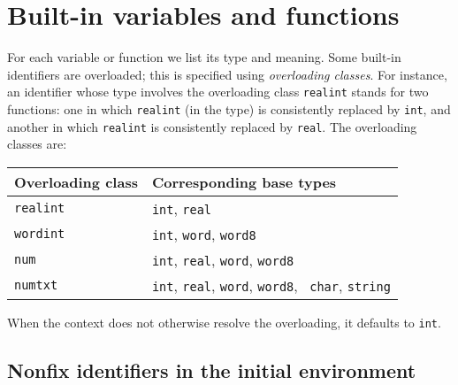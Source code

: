 \documentclass[fleqn,a4paper]{article}
\begin{document}
\newpage

\section{Built-in variables and functions}

For each variable or function we list its type and meaning.  Some
built-in identifiers are overloaded; this is specified using {\em
  overloading classes\/}.  For instance, an identifier whose type
involves the overloading class {\tt realint} stands for two functions:
one in which {\tt realint} (in the type) is consistently replaced by
{\tt int}, and another in which {\tt realint} is consistently replaced
by {\tt real}.  The overloading classes are:

\begin{center}
\begin{tabular}{|l|l|}\hline
Overloading class & Corresponding base types\\\hline
{\tt realint} & {\tt int}, {\tt real}\\
{\tt wordint} & {\tt int}, {\tt word}, {\tt word8}\\
{\tt num} &  {\tt int}, {\tt real}, {\tt word}, {\tt word8}\\
{\tt numtxt} &  {\tt int}, {\tt real}, {\tt word}, {\tt word8}, {\tt
  char}, {\tt string}\\\hline
\end{tabular}
\end{center}

\noindent When the context does not otherwise resolve the overloading,
it defaults to {\tt int}.


\subsection*{Nonfix identifiers in the initial environment}
\end{document}
